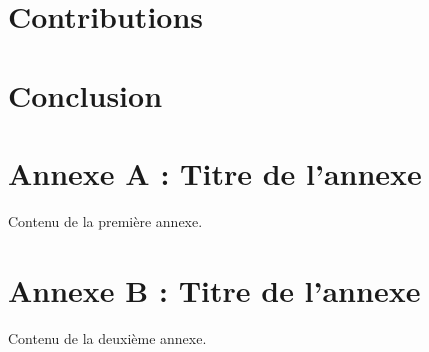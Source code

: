 \documentclass[11pt]{article}
\theoremstyle{definition}
\theoremstyle{remark}
\begin{document}
\section{Contributions}

\section{Conclusion}

\newpage

\printbibliography

\newpage

\appendix

\section{Annexe A : Titre de l'annexe}
Contenu de la première annexe.

\section{Annexe B : Titre de l'annexe}
Contenu de la deuxième annexe.

\end{document}
